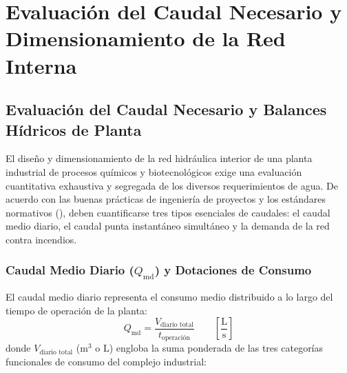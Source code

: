 \documentclass{report}
\begin{document}
\chapter{Evaluación del Caudal Necesario y Dimensionamiento de la Red Interna}
\label{cap:caudal_dimensionamiento_red}

\section{Evaluación del Caudal Necesario y Balances Hídricos de Planta}

El diseño y dimensionamiento de la red hidráulica interior de una planta industrial de procesos químicos y biotecnológicos exige una evaluación cuantitativa exhaustiva y segregada de los diversos requerimientos de agua. De acuerdo con las buenas prácticas de ingeniería de proyectos y los estándares normativos (\cite{UNE_EN_806_3_2007, UNE_149201_2017}), deben cuantificarse tres tipos esenciales de caudales: el caudal medio diario, el caudal punta instantáneo simultáneo y la demanda de la red contra incendios.

\subsection{Caudal Medio Diario ($Q_{\text{md}}$) y Dotaciones de Consumo}

El caudal medio diario representa el consumo medio distribuido a lo largo del tiempo de operación de la planta:
\begin{equation}
    Q_{\text{md}} = \frac{V_{\text{diario total}}}{t_{\text{operación}}} \qquad \left[\frac{\text{L}}{\text{s}}\right]
    \label{eq:caudal_medio_diario}
\end{equation}
donde $V_{\text{diario total}}$ ($\text{m}^3$ o $\text{L}$) engloba la suma ponderada de las tres categorías funcionales de consumo del complejo industrial:
\end{document}
